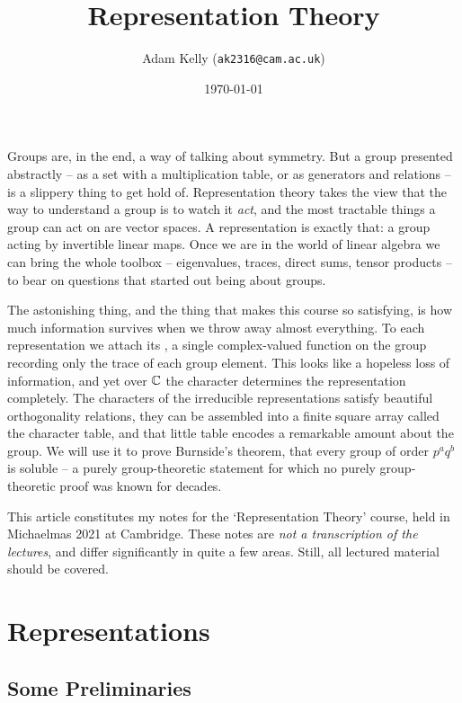 \documentclass[a4paper]{scrartcl}
\title{Representation Theory}
\author{Adam Kelly (\texttt{ak2316@cam.ac.uk})}
\date{\today}
\begin{document}
\maketitle

Groups are, in the end, a way of talking about symmetry. But a group presented abstractly -- as a set with a multiplication table, or as generators and relations -- is a slippery thing to get hold of. Representation theory takes the view that the way to understand a group is to watch it \emph{act}, and the most tractable things a group can act on are vector spaces. A representation is exactly that: a group acting by invertible linear maps. Once we are in the world of linear algebra we can bring the whole toolbox -- eigenvalues, traces, direct sums, tensor products -- to bear on questions that started out being about groups.

The astonishing thing, and the thing that makes this course so satisfying, is how much information survives when we throw away almost everything. To each representation we attach its , a single complex-valued function on the group recording only the trace of each group element. This looks like a hopeless loss of information, and yet over $\mathbb{C}$ the character determines the representation completely. The characters of the irreducible representations satisfy beautiful orthogonality relations, they can be assembled into a finite square array called the character table, and that little table encodes a remarkable amount about the group. We will use it to prove Burnside's theorem, that every group of order $p^a q^b$ is soluble -- a purely group-theoretic statement for which no purely group-theoretic proof was known for decades.

This article constitutes my notes for the `Representation Theory' course, held in Michaelmas 2021 at Cambridge. These notes are \emph{not a transcription of the lectures}, and differ significantly in quite a few areas. Still, all lectured material should be covered.

\tableofcontents

\clearpage

\section{Representations}

\subsection{Some Preliminaries}
\end{document}

